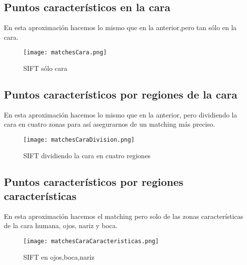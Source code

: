 \documentclass[12pt,a4paper]{article}
\begin{document}
\subsection{Puntos característicos en la cara}
En esta aproximación hacemos lo mismo que en la anterior,pero tan sólo en la cara.
\begin{figure}[H]
\centering
\texttt{[image: matchesCara.png]}
\caption{SIFT sólo cara}
\end{figure}
\subsection{Puntos característicos por regiones de la cara}
En esta aproximación hacemos lo mismo que en la anterior, pero dividiendo la cara en cuatro zonas para así asegurarnos de un matching más preciso.
\begin{figure}[H]
\centering
\texttt{[image: matchesCaraDivision.png]}
\caption{SIFT dividiendo la cara en cuatro regiones}
\end{figure}
\subsection{Puntos característicos por regiones características}
En esta aproximación hacemos el matching pero solo de las zonas características de la cara humana, ojos, nariz y boca.
\begin{figure}[H]
\centering
\texttt{[image: matchesCaraCaracteristicas.png]}
\caption{SIFT en ojos,boca,nariz}
\end{figure}
\end{document}
